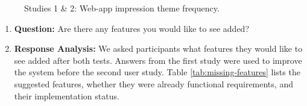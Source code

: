 \documentclass[thesis]{fputhesis}
\newcommand{\ra}[1]{\renewcommand{\arraystretch}{#1}}
\begin{document}
\begin{body}
\begin{figure}[h]
    \caption{Studies 1 \& 2: Web-app impression theme frequency.}
    \label{fig:web app-theme}
\end{figure}
\pagebreak
\begin{enumerate}
    \item[] \textbf{Question: } Are there any features you would like to see added?
    \item[] \textbf{Response Analysis: } We asked participants what features they would like to see added after both tests. Answers from the first study were used to improve the system before the second user study. Table \ref{tab:missing-features} lists the suggested features, whether they were already functional requirements, and their implementation status. 
\end{enumerate}

\begin{table}[h!]\centering
\caption{Studies 1 \& 2: Features participants wanted to see added}\label{tab:missing-features}
\ra{1.2}
\end{table}


\end{body}
\end{document}
